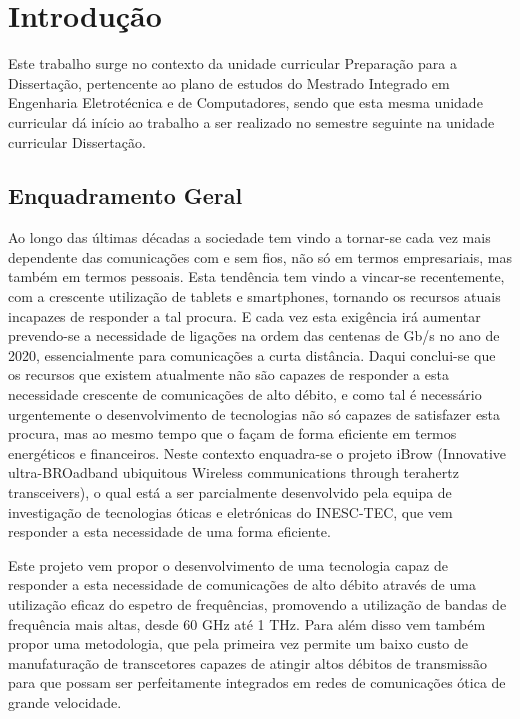 \chapter{Introdução} \label{chap:intro}

Este trabalho surge no contexto da unidade curricular Preparação para a Dissertação, pertencente ao plano de estudos do Mestrado Integrado em Engenharia Eletrotécnica e de Computadores, sendo que esta mesma unidade curricular dá início ao trabalho a ser realizado no semestre seguinte na unidade curricular Dissertação.


\section{Enquadramento Geral} \label{sec:context}
Ao longo das últimas décadas a sociedade tem vindo a tornar-se cada vez mais dependente das comunicações com e sem fios, não só em termos empresariais, mas também em termos pessoais. Esta tendência tem vindo a vincar-se recentemente, com a crescente utilização de tablets e smartphones, tornando os recursos atuais incapazes de responder a tal procura. E cada vez esta exigência irá aumentar prevendo-se a necessidade de ligações na ordem das centenas de Gb/s no ano de 2020, essencialmente para comunicações a curta distância. Daqui conclui-se que os recursos que existem atualmente não são capazes de responder a esta necessidade crescente de comunicações de alto débito, e como tal é necessário urgentemente o desenvolvimento de tecnologias não só capazes de satisfazer esta procura, mas ao mesmo tempo que o façam de forma eficiente em termos energéticos e financeiros. Neste contexto enquadra-se o projeto iBrow (Innovative ultra-BROadband ubiquitous Wireless communications through terahertz transceivers), o qual está a ser parcialmente desenvolvido pela equipa de investigação de tecnologias óticas e eletrónicas do INESC-TEC, que vem responder a esta necessidade de uma forma eficiente.

Este projeto vem propor o desenvolvimento de uma tecnologia capaz de responder a esta necessidade de comunicações de alto débito através de uma utilização eficaz do espetro de frequências, promovendo a utilização de bandas de frequência mais altas, desde 60 GHz até 1 THz. Para além disso vem também propor uma metodologia, que pela primeira vez permite um baixo custo de manufaturação de transcetores capazes de atingir altos débitos de transmissão para que possam ser perfeitamente integrados em redes de comunicações ótica de grande velocidade.
 

